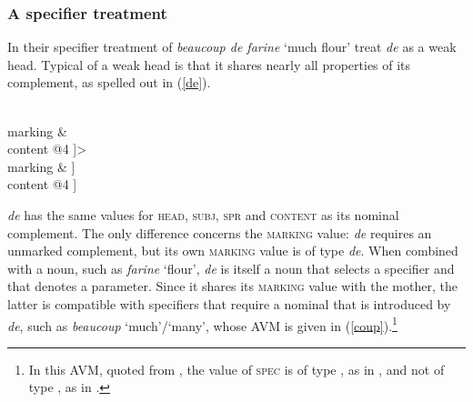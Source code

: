 \documentclass[output=paper
                ,modfonts
                ,nonflat
	        ,collection
	        ,collectionchapter
	        ,collectiontoclongg
 	        ,biblatex
                ,babelshorthands
                ,newtxmath
                ,draftmode
                ,colorlinks, citecolor=brown
]{./langsci/langscibook}
\begin{document}
\subsubsection{A specifier treatment} 


In their specifier treatment of \emph{beaucoup de farine} `much flour'  
\citet{Abeilleetal04} treat \emph{de} as a weak head. 
Typical of a weak head is that it shares 
nearly all properties of its complement, as spelled out in (\ref{de}).

\begin{exe} 
\ex\label{de} 
\begin{avm} 
[category [head & @1                                    \\
           subj & @A                                    \\
           spr  & @B                                     \\
           comps & <[category [head & @1                 \\
                               subj & @A                 \\
                               spr  & @B                 \\
                               comps & < >]              \\
                               marking &  \\
                     content @4 ]>                       \\ 
           marking & ]                          \\
 content @4 ] 
\end{avm}
\end{exe} 

\noindent
\emph{de} has the same values for \textsc{head}, \textsc{subj}, \textsc{spr} and 
\textsc{content} as its nominal complement. 
The only difference concerns the \textsc{marking} value: \emph{de} requires an 
unmarked complement, but its own \textsc{marking} value is of type \emph{de}. 
When combined with a noun, such as \emph{farine} `flour', \emph{de} is itself a noun 
that selects a specifier and that denotes a parameter.
Since it shares its \textsc{marking} value with the mother, the latter is 
compatible with specifiers that require a nominal that is introduced by \emph{de}, 
such as \emph{beaucoup} `much'/`many', whose AVM is given in 
(\ref{coup}).\footnote{In this AVM, quoted from \citet[18]{Abeilleetal04}, 
the value of \textsc{spec} is of type , as in \citet{ps2}, and not of type 
, as in \citet{GS00}.}  
\end{document}

